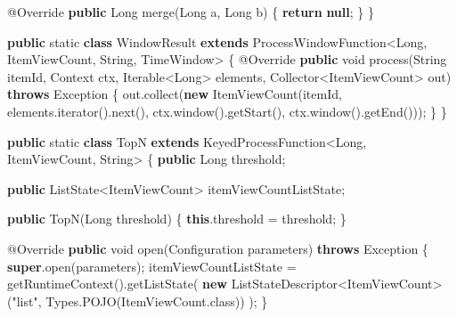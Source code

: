 \documentclass[cn,11pt,chinese]{elegantbook}
\newenvironment{Shaded}{}{}
\newcommand{\AttributeTok}[1]{\textcolor[rgb]{0.49,0.56,0.16}{#1}}
\newcommand{\BuiltInTok}[1]{#1}
\newcommand{\DataTypeTok}[1]{\textcolor[rgb]{0.56,0.13,0.00}{#1}}
\newcommand{\FunctionTok}[1]{\textcolor[rgb]{0.02,0.16,0.49}{#1}}
\newcommand{\KeywordTok}[1]{\textcolor[rgb]{0.00,0.44,0.13}{\textbf{#1}}}
\newcommand{\NormalTok}[1]{#1}
\newcommand{\StringTok}[1]{\textcolor[rgb]{0.25,0.44,0.63}{#1}}
\begin{document}
\begin{Shaded}
\begin{Highlighting}[]
        \AttributeTok{@Override}
        \KeywordTok{public} \BuiltInTok{Long} \FunctionTok{merge}\NormalTok{(}\BuiltInTok{Long}\NormalTok{ a, }\BuiltInTok{Long}\NormalTok{ b) \{}
            \KeywordTok{return} \KeywordTok{null}\NormalTok{;}
\NormalTok{        \}}
\NormalTok{    \}}

    \KeywordTok{public} \DataTypeTok{static} \KeywordTok{class}\NormalTok{ WindowResult }\KeywordTok{extends}\NormalTok{ ProcessWindowFunction\textless{}}\BuiltInTok{Long}\NormalTok{, ItemViewCount, }\BuiltInTok{String}\NormalTok{, TimeWindow\textgreater{} \{}
        \AttributeTok{@Override}
        \KeywordTok{public} \DataTypeTok{void} \FunctionTok{process}\NormalTok{(}\BuiltInTok{String}\NormalTok{ itemId, }\BuiltInTok{Context}\NormalTok{ ctx, }\BuiltInTok{Iterable}\NormalTok{\textless{}}\BuiltInTok{Long}\NormalTok{\textgreater{} elements, Collector\textless{}ItemViewCount\textgreater{} out) }\KeywordTok{throws} \BuiltInTok{Exception}\NormalTok{ \{}
\NormalTok{            out.}\FunctionTok{collect}\NormalTok{(}\KeywordTok{new} \FunctionTok{ItemViewCount}\NormalTok{(itemId, elements.}\FunctionTok{iterator}\NormalTok{().}\FunctionTok{next}\NormalTok{(), ctx.}\FunctionTok{window}\NormalTok{().}\FunctionTok{getStart}\NormalTok{(), ctx.}\FunctionTok{window}\NormalTok{().}\FunctionTok{getEnd}\NormalTok{()));}
\NormalTok{        \}}
\NormalTok{    \}}

    \KeywordTok{public} \DataTypeTok{static} \KeywordTok{class}\NormalTok{ TopN }\KeywordTok{extends}\NormalTok{ KeyedProcessFunction\textless{}}\BuiltInTok{Long}\NormalTok{, ItemViewCount, }\BuiltInTok{String}\NormalTok{\textgreater{} \{}
        \KeywordTok{public} \BuiltInTok{Long}\NormalTok{ threshold;}

        \KeywordTok{public}\NormalTok{ ListState\textless{}ItemViewCount\textgreater{} itemViewCountListState;}

        \KeywordTok{public} \FunctionTok{TopN}\NormalTok{(}\BuiltInTok{Long}\NormalTok{ threshold) \{}
            \KeywordTok{this}\NormalTok{.}\FunctionTok{threshold}\NormalTok{ = threshold;}
\NormalTok{        \}}

        \AttributeTok{@Override}
        \KeywordTok{public} \DataTypeTok{void} \FunctionTok{open}\NormalTok{(}\BuiltInTok{Configuration}\NormalTok{ parameters) }\KeywordTok{throws} \BuiltInTok{Exception}\NormalTok{ \{}
            \KeywordTok{super}\NormalTok{.}\FunctionTok{open}\NormalTok{(parameters);}
\NormalTok{            itemViewCountListState = }\FunctionTok{getRuntimeContext}\NormalTok{().}\FunctionTok{getListState}\NormalTok{(}
                    \KeywordTok{new}\NormalTok{ ListStateDescriptor\textless{}ItemViewCount\textgreater{}(}\StringTok{"list"}\NormalTok{, }\BuiltInTok{Types}\NormalTok{.}\FunctionTok{POJO}\NormalTok{(ItemViewCount.}\FunctionTok{class}\NormalTok{))}
\NormalTok{            );}
\NormalTok{        \}}


\end{Highlighting}
\end{Shaded}
\end{document}
